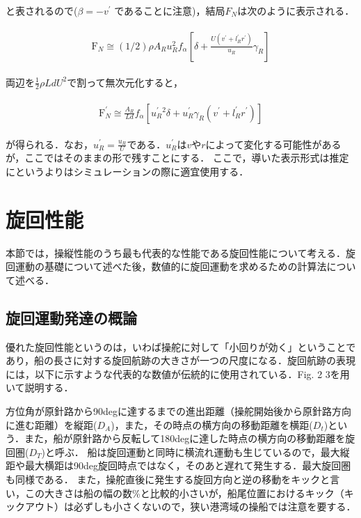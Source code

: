 と表されるので($\beta=-v^{\prime}$ であることに注意)，結局$F_N$は次のように表示される．

\begin{align}
    \begin{split}
        \mathrm{F}_{N} \cong(1 / 2) \rho A_{R} u_{R}^{2} f_{\alpha}\left[\delta+\frac{U\left(v^{\prime}+l^{\prime}_{R} r^{\prime}\right)}{u_{R}} \gamma_{R}\right] \label{eq:2-49}
    \end{split}
\end{align}

両辺を$\frac{1}{2} \rho L d U^2$で割って無次元化すると，

\begin{align}
    \begin{split}
        \mathrm{F}_{N}^{\prime} \cong \frac{A_{R}}{L d} f_{\alpha}\left[u_{R}^{\prime}{ }^{2} \delta+u_{R}^{\prime} \gamma_{R}\left(v^{\prime}+l_{R}^{\prime} r^{\prime}\right)\right] \label{eq:2-50}
    \end{split}
\end{align}

が得られる．なお，$u^{\prime}_R=\frac{u_R}{U}$である．$u^{\prime}_R$は$v$や$r$によって変化する可能性があるが，ここではそのままの形で残すことにする．
ここで，導いた表示形式は推定にというよりはシミュレーションの際に適宜使用する．

\section{旋回性能}

本節では，操縦性能のうち最も代表的な性能である旋回性能について考える．旋回運動の基礎について述べた後，数値的に旋回運動を求めるための計算法について述べる．

\subsection{旋回運動発達の概論}
優れた旋回性能というのは，いわば操舵に対して「小回りが効く」ということであり，船の長さに対する旋回航跡の大きさが一つの尺度になる．旋回航跡の表現には，以下に示すような代表的な数値が伝統的に使用されている．Fig. 2 3を用いて説明する．

方位角が原針路から90degに達するまでの進出距離（操舵開始後から原針路方向に進む距離）を縦距($D_A$)，また，その時点の横方向の移動距離を横距($D_t$)という．また，船が原針路から反転して180degに達した時点の横方向の移動距離を旋回圏($D_T$)と呼ぶ．
船は旋回運動と同時に横流れ運動も生じているので，最大縦距や最大横距は90deg旋回時点ではなく，そのあと遅れて発生する．最大旋回圏も同様である．
また，操舵直後に発生する旋回方向と逆の移動をキックと言い，この大きさは船の幅の数\%と比較的小さいが，船尾位置におけるキック（キックアウト）は必ずしも小さくないので，狭い港湾域の操船では注意を要する．

